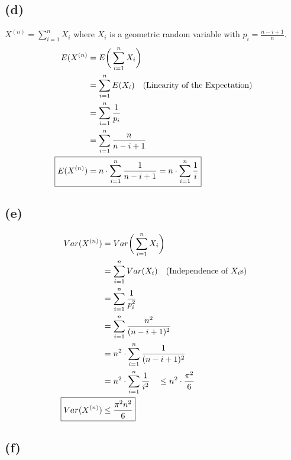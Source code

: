 \documentclass[11pt, fleqn]{article}
\begin{document}
\subsection*{(d)}
$X^{(n)} = \sum_{i=1}^{n} X_i$ where $X_i$ is a geometric random variable with $p_i = \frac{n-i+1}{n}$.
\begin{equation}
    \begin{split}
        E(X^{(n)} &= E\bigg(\sum_{i=1}^{n} X_i\bigg) \\
            &= \sum_{i=1}^{n} E(X_i) \hspace{1em} \text{(Linearity of the Expectation)}  \\
            &= \sum_{i=1}^{n} \frac{1}{p_i} \\
            &= \sum_{i=1}^{n} \frac{n}{n-i+1} \\
       \Aboxed{E(X^{(n)}) &= n \cdot \sum_{i=1}^{n} \frac{1}{n-i+1} = n \cdot \sum_{i=1}^{n} \frac{1}{i}}
    \end{split}
\end{equation}

\subsection*{(e)}
\begin{equation}
    \begin{split}
        Var(X^{(n)}) &= Var\bigg(\sum_{i=1}^{n} X_i\bigg) \\
            &= \sum_{i=1}^{n} Var(X_i) \hspace{1em} \text{(Independence of $X_i$s)} \\
            &= \sum_{i=1}^{n} \frac{1}{p_i^2} \\
            &= \sum_{i=1}^{n} \frac{n^2}{(n-i+1)^2} \\
            &= n^2 \cdot \sum_{i=1}^{n} \frac{1}{(n-i+1)^2} \\
            &= n^2 \cdot \sum_{i=1}^{n} \frac{1}{i^2} \quad \le n^2 \cdot \frac{\pi^2}{6} \\
        \Aboxed{Var(X^{(n)}) &\le \frac{\pi^2n^2}{6}}
    \end{split}
\end{equation}

\subsection*{(f)}
\end{document}
